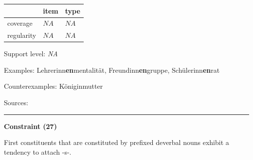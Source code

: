 \vspace{-0.25em}

\begin{table}[!ht]
\begin{center}
\setlength{\extrarowheight}{1pt}
\begin{tabularx}{\columnwidth}{|X|X|X|}
\hline
 & item & type \\
\hline
 coverage & $NA$ & $NA$ \\
\hline
 regularity & $NA$ & $NA$ \\
\hline
\end{tabularx}
\end{center}
\end{table}

\vspace{-1.35em}

\noindent
Support level: \textit{NA}

\vspace{0.3em}

\noindent
Examples: Lehrerinn\textbf{en}mentalität, Freundinn\textbf{en}gruppe, Schülerinn\textbf{en}rat

\noindent
Counterexamples: Königin{\zeroLinker}mutter

\vspace{0.3em}

\noindent
Sources: \citet[94]{ortner_mueller-bollhagen_1991}

\vspace{0.35em}
\hrule




\vspace{0.4em}

\begin{center}
\textbf{Constraint (27)}
\end{center}

\noindent
First constituents that are constituted by prefixed deverbal nouns exhibit a tendency to attach -s-.
\vspace{0.5em}


